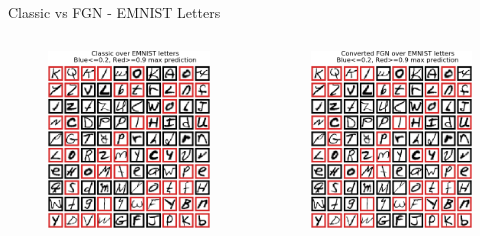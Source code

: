\documentclass{beamer}
\begin{document}
\begin{frame}{Classic vs FGN - EMNIST Letters }
    \vspace{-2mm}
    \begin{columns}
    \begin{column}{.33\textwidth}
    \begin{figure}
        \includegraphics[width=.85\textwidth]{images/mnist-behavior/classic-pred-emnist.png}
    \end{figure}
    \end{column}
    \begin{column}{.33\textwidth}
    \begin{figure}
        \includegraphics[width=.85\textwidth]{images/mnist-behavior/converted-pred-emnist.png}

\end{figure}
\end{column}
\end{columns}
\end{frame}
\end{document}
